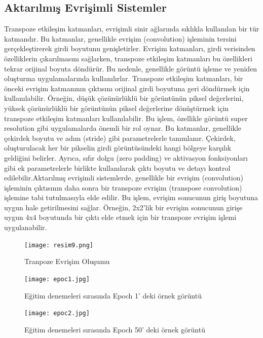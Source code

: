 \documentclass[10pt]{article}
\begin{document}
	\subsection{Aktarılmış Evrişimli Sistemler } 
	Transpoze etkileşim katmanları, evrişimli sinir ağlarında sıklıkla kullanılan bir tür katmandır. Bu katmanlar, genellikle evrişim (convolution) işleminin tersini gerçekleştirerek girdi boyutunu genişletirler. Evrişim katmanları, girdi verisinden özelliklerin çıkarılmasını sağlarken, transpoze etkileşim katmanları bu özellikleri tekrar orijinal boyuta döndürür. Bu nedenle, genellikle görüntü işleme ve yeniden oluşturma uygulamalarında kullanılırlar.
	Transpoze etkileşim katmanları, bir önceki evrişim katmanının çıktısını orijinal girdi boyutuna geri döndürmek için kullanılabilir. Örneğin, düşük çözünürlüklü bir görüntünün piksel değerlerini, yüksek çözünürlüklü bir görüntünün piksel değerlerine dönüştürmek için transpoze etkileşim katmanları kullanılabilir. Bu işlem, özellikle görüntü super resolution gibi uygulamalarda önemli bir rol oynar.
	Bu katmanlar, genellikle çekirdek boyutu ve adım (stride) gibi parametrelerle tanımlanır. Çekirdek, oluşturulacak her bir pikselin girdi görüntüsündeki hangi bölgeye karşılık geldiğini belirler. Ayrıca, sıfır dolgu (zero padding) ve aktivasyon fonksiyonları gibi ek parametrelerle birlikte kullanılarak çıktı boyutu ve detayı kontrol edilebilir.Aktarılmış evrişimli sistemlerde, genellikle bir evrişim (convolution) işleminin çıktısının daha sonra bir transpoze evrişim (transpose convolution) işlemine tabi tutulmasıyla elde edilir. Bu işlem, evrişim sonucunun giriş boyutuna uygun hale getirilmesini sağlar. Örneğin, 2x2'lik bir evrişim sonucunun girişe uygun 4x4 boyutunda bir çıktı elde etmek için bir transpoze evrişim işlemi uygulanabilir.
	
	\begin{figure}[htbp]
		\centering
		\texttt{[image: resim9.png]}
		\caption{Tranpoze Evrişim Oluşumu \cite{transposed_medium}}
		\label{fig:uretici_tuketici7}
	\end{figure}
	
	\begin{figure}[htbp]
		\centering
		\texttt{[image: epoc1.jpg]}
		\caption{Eğitim denemeleri sırasında Epoch 1' deki örnek görüntü }
		\label{fig:epoch1}
	\end{figure}
	
	\begin{figure}[htbp]
		\centering
		\texttt{[image: epoc2.jpg]}
		\caption{Eğitim denemeleri sırasında Epoch 50' deki  örnek görüntü }
		\label{fig:epoch1}
	\end{figure}
	
\end{document}
